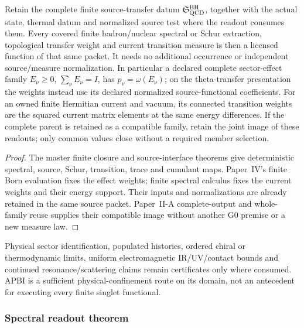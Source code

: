 \documentclass[12pt,a4paper]{article}
\begin{document}
\begin{corollary}
\label{p10:cor:finite-qcd-parent-readouts}
Retain the complete finite source-transfer datum
\(\mathfrak S_{\rm QCD}^{\rm BH}\), together with the actual state, thermal
datum and normalized source test where the readout consumes them.
Every covered finite hadron/nuclear spectral or Schur extraction, topological
transfer weight and current transition measure is then a licensed function
of that same packet.  It needs no additional occurrence or independent
source/measure normalization.
In particular a declared complete sector-effect family
\(E_\nu\ge0\), \(\sum_\nu E_\nu=I\), has
\(p_\nu=\omega(E_\nu)\); on the theta-transfer presentation the weights
instead use its declared normalized source-functional coefficients.
For an owned finite Hermitian current and vacuum, its connected transition
weights are the squared current matrix elements at the same energy
differences.  If the complete parent is retained as a compatible family,
retain the joint image of these readouts; only common values close without
a required member selection.
\end{corollary}
\begin{proof}
The master finite closure and source-interface theorems give deterministic
spectral, source, Schur, transition, trace and cumulant maps.
Paper~IV's finite Born evaluation fixes the effect weights; finite spectral
calculus fixes the current weights and their energy support.
Their inputs and normalizations are already retained in the same source
packet.  Paper~II-A complete-output and whole-family reuse supplies their
compatible image without another G0 premise or a new measure law.
\end{proof}
Physical sector identification, populated histories, ordered chiral or
thermodynamic limits, uniform electromagnetic IR/UV/contact bounds and
continued resonance/scattering claims remain certificates only where
consumed.  APBI is a sufficient physical-confinement route on its domain,
not an antecedent for executing every finite singlet functional.



\subsubsection{Spectral readout theorem}
\label{p10:subsec:spectral-readout-theorem}
\end{document}
